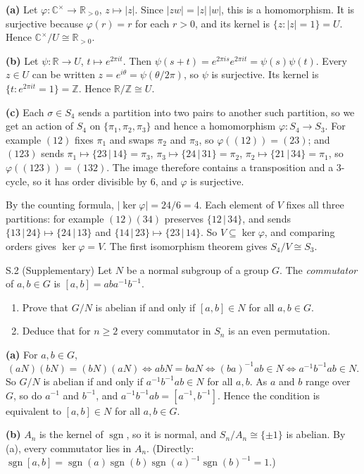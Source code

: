 \documentclass[11pt]{article}
\newcommand{\Z}{\mathbb{Z}}
\newcommand{\R}{\mathbb{R}}
\newcommand{\C}{\mathbb{C}}
\begin{document}
\begin{solution}
\textbf{(a)} Let $\varphi:\C^\times\to\R_{>0}$, $z\mapsto|z|$. Since
$|zw|=|z|\,|w|$, this is a homomorphism. It is surjective because
$\varphi(r)=r$ for each $r>0$, and its kernel is
$\{z:|z|=1\}=U$. Hence $\C^\times/U\cong\R_{>0}$.

\textbf{(b)} Let $\psi:\R\to U$, $t\mapsto e^{2\pi it}$. Then
$\psi(s+t)=e^{2\pi is}e^{2\pi it}=\psi(s)\psi(t)$. Every $z\in U$ can be
 written $z=e^{i\theta}=\psi(\theta/2\pi)$, so $\psi$ is surjective.
 Its kernel is $\{t:e^{2\pi it}=1\}=\Z$. Hence $\R/\Z\cong U$.

\textbf{(c)} Each $\sigma\in S_4$ sends a partition into two pairs to
 another such partition, so we get an action of $S_4$ on
$\{\pi_1,\pi_2,\pi_3\}$ and hence a homomorphism
$\varphi:S_4\to S_3$. For example $(12)$ fixes $\pi_1$ and swaps $\pi_2$ and
$\pi_3$, so $\varphi((12))=(23)$; and $(123)$ sends
$\pi_1\mapsto\{23\,|\,14\}=\pi_3$, $\pi_3\mapsto\{24\,|\,31\}=\pi_2$,
$\pi_2\mapsto\{21\,|\,34\}=\pi_1$, so $\varphi((123))=(132)$.
 The image therefore contains a transposition and a $3$-cycle, so it has
 order divisible by $6$, and $\varphi$ is surjective.

 By the counting formula, $|\ker\varphi|=24/6=4$. Each element of $V$ fixes all three
 partitions: for example $(12)(34)$ preserves $\{12\,|\,34\}$, and sends
$\{13\,|\,24\}\mapsto\{24\,|\,13\}$ and $\{14\,|\,23\}\mapsto\{23\,|\,14\}$.
 So $V\subseteq\ker\varphi$, and comparing orders gives $\ker\varphi=V$.
 The first isomorphism theorem gives $S_4/V\cong S_3$.
\end{solution}

\begin{exercise}{S.2 (Supplementary)}
Let $N$ be a normal subgroup of a group $G$. The \emph{commutator} of
$a,b\in G$ is $[a,b]=aba^{-1}b^{-1}$.
\begin{enumerate}[label=\textbf{(\alph*)}]
  \item Prove that $G/N$ is abelian if and only if $[a,b]\in N$ for all
        $a,b\in G$.
  \item Deduce that for $n\geq 2$ every commutator in $S_n$ is an even permutation.
\end{enumerate}
\end{exercise}

\begin{solution}
\textbf{(a)} For $a,b\in G$,
\[
  (aN)(bN)=(bN)(aN)\iff abN=baN\iff (ba)^{-1}ab\in N
  \iff a^{-1}b^{-1}ab\in N.
\]
 So $G/N$ is abelian if and only if $a^{-1}b^{-1}ab\in N$ for all $a,b$.
 As $a$ and $b$ range over $G$, so do $a^{-1}$ and $b^{-1}$, and
$a^{-1}b^{-1}ab=[a^{-1},b^{-1}]$. Hence the condition is equivalent to
$[a,b]\in N$ for all $a,b\in G$.

\textbf{(b)} $A_n$ is the kernel of $\operatorname{sgn}$, so it is normal, and
$S_n/A_n\cong\{\pm1\}$ is abelian. By (a), every commutator lies in $A_n$.
 (Directly: $\operatorname{sgn}[a,b]=\operatorname{sgn}(a)\operatorname{sgn}(b)
\operatorname{sgn}(a)^{-1}\operatorname{sgn}(b)^{-1}=1$.)
\end{solution}
\end{document}
